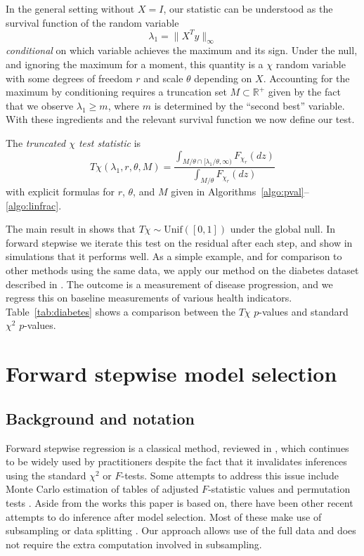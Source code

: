 \documentclass[oupdraft]{bio}
\def\real{{\mathbb R}}
\newenvironment{definition}[1][Definition]{\begin{trivlist}
\item[\hskip \labelsep {\bfseries #1}]}{\end{trivlist}}
\begin{document}
In the general setting without $X = I$, our statistic can be understood 
as the survival function of the random variable
\begin{equation}
\label{eq:lam1}
\lambda_1 = \|X^Ty\|_{\infty}
\end{equation}
{\em conditional} on which variable achieves the maximum and its sign.
Under the null, and ignoring the maximum for a moment, this quantity is
a $\chi$ random variable with some degrees of freedom $r$ and scale
$\theta$ depending on $X$. Accounting for the maximum by conditioning requires
a truncation set $M \subset \real^+$ given by the fact that we observe
$\lambda_1 \geq m$, where $m$ is determined by the ``second best'' variable.
With these ingredients and the relevant survival function we now define
our test.
\begin{definition}
The {\em truncated $\chi$ test statistic} is
\begin{equation}
\label{eq:tchi}
T\chi(\lambda_1, r, \theta,  M) = \frac{\int_{M /\theta \cap [\lambda_1/\theta,\infty)} F_{\chi_r}(dz)}{\int_{M / \theta} F_{\chi_r}(dz)}
\end{equation}
with explicit formulas for $r$, $\theta$, and $M$ given in
Algorithms~\ref{algo:pval}--\ref{algo:linfrac}.
\end{definition}

The main result in \cite{tests:adaptive} shows that
$T\chi \sim \text{Unif}([0,1])$ under the global null. In forward stepwise
we iterate this test on the residual after each step, and show in simulations
that it performs well. As a simple example, and for comparison to other methods using the same data, we apply our method on the diabetes dataset described in \cite{lars}. The outcome is a measurement of disease progression, and we regress this on baseline measurements of various health indicators. Table~\ref{tab:diabetes} shows a comparison between the $T\chi$ $p$-values and standard $\chi^2$ $p$-values.


\section{Forward stepwise model selection}

\subsection{Background and notation}

Forward stepwise regression is a classical method, reviewed in
\cite{classical:selection}, which continues to be widely used by
practitioners despite the fact that it invalidates inferences using
the standard $\chi^2$ or $F$-tests. Some attempts to address this
issue include Monte Carlo estimation of tables of adjusted
$F$-statistic values \citep{mc:ftoenter} and permutation tests
\citep{permutation:stop}. Aside from the works this paper is based on,
there have been other recent attempts to do inference after model
selection. Most of these make use of subsampling
\citep{meinshausen:buhlmann} or data splitting
\citep{wasserman:roeder}. Our approach allows use of the full data and
does not require the extra computation involved in subsampling.
\end{document}
